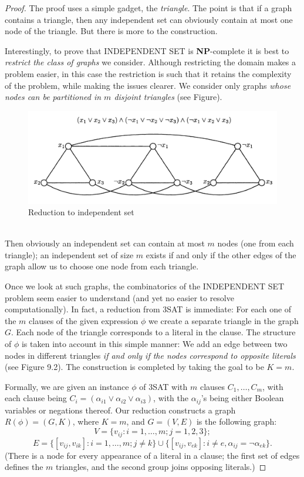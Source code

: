 \documentclass[12pt]{article}
\begin{document}
\begin{proof}
  The proof uses a simple gadget, the \textit{triangle}. The point is that if a graph contains a triangle, then any independent set can obviously contain at most one node of the triangle. But there is more to the construction.

Interestingly, to prove that \textsc{INDEPENDENT SET} is \textbf{NP}-complete it is best to \textit{restrict the class of graphs} we consider. Although restricting the domain makes a problem easier, in this case the restriction is such that it retains the complexity of the problem, while making the issues clearer. We consider only graphs \textit{whose nodes can be partitioned in $m$ disjoint triangles} (see Figure).
\begin{figure}[ht]
  \centering
  \includegraphics[width=1\textwidth]{img/independent_set.png}
  \caption{Reduction to independent set}
\end{figure}
\\
Then obviously an independent set can contain at most $m$ nodes (one from each triangle); an independent set of size $m$ exists if and only if the other edges of the graph allow us to choose one node from each triangle.

Once we look at such graphs, the combinatorics of the \textsc{INDEPENDENT SET} problem seem easier to understand (and yet no easier to resolve computationally). In fact, a reduction from \textsc{3SAT} is immediate: For each one of the $m$ clauses of the given expression $\phi$ we create a separate triangle in the graph $G$. Each node of the triangle corresponds to a literal in the clause. The structure of $\phi$ is taken into account in this simple manner: We add an edge between two nodes in different triangles \textit{if and only if the nodes correspond to opposite literals} (see Figure 9.2). The construction is completed by taking the goal to be $K = m$.

Formally, we are given an instance $\phi$ of \textsc{3SAT} with $m$ clauses $C_1, \ldots, C_m$, with each clause being $C_i = (\alpha_{i1} \vee \alpha_{i2} \vee \alpha_{i3})$, with the $\alpha_{ij}$'s being either Boolean variables or negations thereof. Our reduction constructs a graph $R(\phi) = (G, K)$, where $K = m$, and $G = (V, E)$ is the following graph: 
\[
V = \{v_{ij} : i = 1, \ldots, m; j = 1, 2, 3\}; 
 \]
 \[ E = \{[v_{ij}, v_{ik}] : i = 1, \ldots, m; j \neq k\} \cup \{[v_{ij}, v_{ek}] : i \neq e, \alpha_{ij} = \neg \alpha_{ek}\}.
\]
(There is a node for every appearance of a literal in a clause; the first set of edges defines the $m$ triangles, and the second group joins opposing literals.)


\end{proof}
\end{document}

